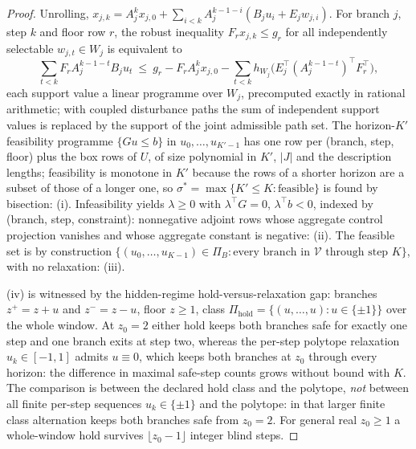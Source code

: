 \documentclass[11pt,a4paper]{article}
\theoremstyle{plain}
\theoremstyle{definition}
\theoremstyle{remark}
\newcommand{\cV}{\mathcal{V}}
\begin{document}
\begin{proof}
Unrolling, $x_{j,k}=A_j^kx_{j,0}+\sum_{i<k}A_j^{k-1-i}(B_ju_i+E_jw_{j,i})$. For branch $j$, step $k$ and floor row $r$, the robust inequality $F_rx_{j,k}\le g_r$ for all independently selectable $w_{j,t}\in W_j$ is equivalent to
\[
\sum_{t<k}F_rA_j^{k-1-t}B_ju_t\ \le\ g_r-F_rA_j^kx_{j,0}-\sum_{t<k}h_{W_j}\bigl(E_j^\top(A_j^{k-1-t})^\top F_r^\top\bigr),
\]
each support value a linear programme over $W_j$, precomputed exactly in rational arithmetic; with coupled disturbance paths the sum of independent support values is replaced by the support of the joint admissible path set. The horizon-$K'$ feasibility programme $\{Gu\le b\}$ in $u_0,\dots,u_{K'-1}$ has one row per (branch, step, floor) plus the box rows of $U$, of size polynomial in $K'$, $|J|$ and the description lengths; feasibility is monotone in $K'$ because the rows of a shorter horizon are a subset of those of a longer one, so $\sigma^*=\max\{K'\le K:\text{feasible}\}$ is found by bisection: (i). Infeasibility yields $\lambda\ge0$ with $\lambda^\top G=0$, $\lambda^\top b<0$, indexed by (branch, step, constraint): nonnegative adjoint rows whose aggregate control projection vanishes and whose aggregate constant is negative: (ii). The feasible set is by construction $\{(u_0,\dots,u_{K-1})\in\Pi_B:\text{every branch in }\cV\text{ through step }K\}$, with no relaxation: (iii).

(iv) is witnessed by the hidden-regime hold-versus-relaxation gap: branches $z^+=z+u$ and $z^-=z-u$, floor $z\ge1$, class $\Pi_{\mathrm{hold}}=\{(u,\dots,u):u\in\{\pm1\}\}$ over the whole window. At $z_0=2$ either hold keeps both branches safe for exactly one step and one branch exits at step two, whereas the per-step polytope relaxation $u_k\in[-1,1]$ admits $u\equiv0$, which keeps both branches at $z_0$ through every horizon: the difference in maximal safe-step counts grows without bound with $K$. The comparison is between the declared hold class and the polytope, \emph{not} between all finite per-step sequences $u_k\in\{\pm1\}$ and the polytope: in that larger finite class alternation keeps both branches safe from $z_0=2$. For general real $z_0\ge1$ a whole-window hold survives $\lfloor z_0-1\rfloor$ integer blind steps.
\end{proof}
\end{document}

